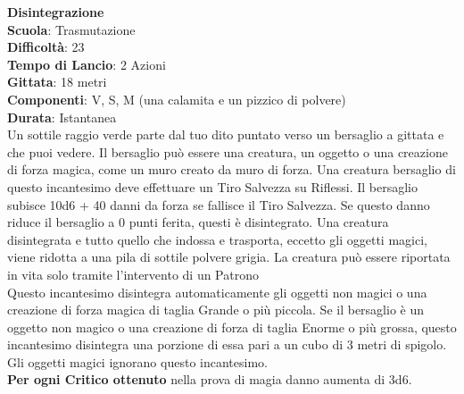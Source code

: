 \begin{multicols}{2}
\medskip\textbf{Disintegrazione}\\
\textbf{Scuola}: Trasmutazione\\
\textbf{Difficoltà}: 23\\
\textbf{Tempo di Lancio}: 2 Azioni\\
\textbf{Gittata}: 18 metri\\
\textbf{Componenti}: V, S, M (una calamita e un pizzico di polvere)\\
\textbf{Durata}: Istantanea\\
Un sottile raggio verde parte dal tuo dito puntato verso un bersaglio a gittata e che puoi vedere. Il bersaglio può essere una creatura, un oggetto o una creazione di forza magica, come un muro creato da muro di forza. Una creatura bersaglio di questo incantesimo deve effettuare un Tiro Salvezza su Riflessi. Il bersaglio subisce 10d6 + 40 danni da forza se fallisce il Tiro Salvezza. Se questo danno riduce il bersaglio a 0 punti ferita, questi è disintegrato. Una creatura disintegrata e tutto quello che indossa e trasporta, eccetto gli oggetti magici, viene ridotta a una pila di sottile polvere grigia. La creatura può essere riportata in vita solo tramite l'intervento di un Patrono\\
Questo incantesimo disintegra automaticamente gli oggetti non magici o una creazione di forza magica di taglia Grande o più piccola. Se il bersaglio è un oggetto non magico o una creazione di forza di taglia Enorme o più grossa, questo incantesimo disintegra una porzione di essa pari a un cubo di 3 metri di spigolo. Gli oggetti magici ignorano questo incantesimo.\\
\textbf{Per ogni Critico ottenuto} nella prova di magia danno aumenta di 3d6.


\end{multicols}
